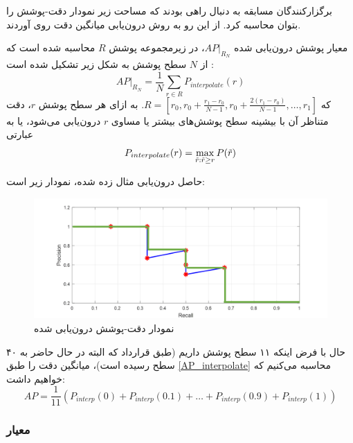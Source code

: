 برگزارکنندگان مسابقه  به دنبال راهی بودند که مساحت زیر نمودار دقت-پوشش را بتوان محاسبه کرد. از این رو به روش درون‌یابی میانگین دقت روی آوردند. 
\begin{definition}
    معیار پوشش درون‌یابی شده $AP \vert_{R_N}$، در زیرمجموعه پوشش $R$ محاسبه شده است که از $N$  سطح پوشش به شکل زیر تشکیل شده است \cite{qian20223d}: 
    \begin{equation}
        AP\vert_{R_N} = \frac{1}{N}\sum_{r\in{R}}{P_{interpolate}(r)}
        \label{AP_interpolate}
    \end{equation}
    که $R = \left[r_0, r_0 + \frac{r_1 - r_0}{N - 1}, r_0 + \frac{2(r_1 - r_0)}{N - 1}, \ldots, r_1\right]$. به ازای هر سطح پوشش $r$، دقت متناظر آن با بیشینه سطح پوشش‌های بیشتر یا مساوی $r$ درون‌یابی می‌شود، یا به عبارتی
    \begin{equation}
        P_{interpolate}(r) = \max_{\Tilde{r}:\Tilde{r}\ge r}{P(\Tilde{r})}
    \end{equation}
\end{definition}
حاصل درون‌یابی مثال زده شده، نمودار زیر است:
\begin{figure}[h!]
    \centering
    \includegraphics[width=1\linewidth]{figures/precision_recall_interpolate.png}
    \caption{نمودار دقت-پوشش درون‌یابی شده}
    \label{fig:precision-recall_interpolate}
\end{figure}

حال با فرض اینکه ۱۱ سطح پوشش داریم (طبق قرارداد  که البته در حال حاضر به ۴۰ سطح رسیده است)، میانگین دقت را طبق \cref{AP_interpolate}
 محاسبه می‌کنیم که خواهیم داشت:
 \begin{equation}
    AP = \frac{1}{11}(P_{interp}(0) + P_{interp}(0.1) + \ldots + P_{interp}(0.9) + P_{interp}(1))
 \end{equation}
 
\subsubsection{معیار }

